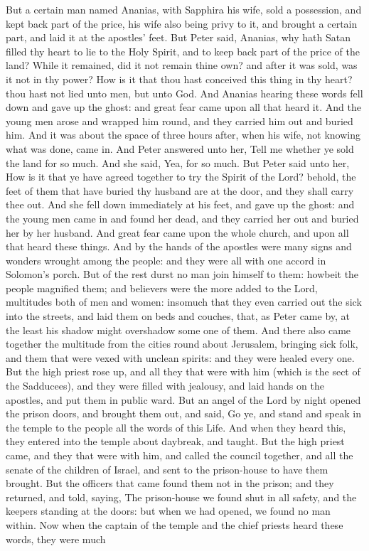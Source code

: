 But a certain man named Ananias, with Sapphira his wife, sold a possession, and kept back part of the price, his wife also being privy to it, and brought a certain part, and laid it at the apostles’ feet. But Peter said, Ananias, why hath Satan filled thy heart to lie to the Holy Spirit, and to keep back part of the price of the land? While it remained, did it not remain thine own? and after it was sold, was it not in thy power? How is it that thou hast conceived this thing in thy heart? thou hast not lied unto men, but unto God. And Ananias hearing these words fell down and gave up the ghost: and great fear came upon all that heard it. And the young men arose and wrapped him round, and they carried him out and buried him.  And it was about the space of three hours after, when his wife, not knowing what was done, came in. And Peter answered unto her, Tell me whether ye sold the land for so much. And she said, Yea, for so much. But Peter said unto her, How is it that ye have agreed together to try the Spirit of the Lord? behold, the feet of them that have buried thy husband are at the door, and they shall carry thee out. And she fell down immediately at his feet, and gave up the ghost: and the young men came in and found her dead, and they carried her out and buried her by her husband. And great fear came upon the whole church, and upon all that heard these things.  And by the hands of the apostles were many signs and wonders wrought among the people: and they were all with one accord in Solomon’s porch. But of the rest durst no man join himself to them: howbeit the people magnified them; and believers were the more added to the Lord, multitudes both of men and women: insomuch that they even carried out the sick into the streets, and laid them on beds and couches, that, as Peter came by, at the least his shadow might overshadow some one of them. And there also came together the multitude from the cities round about Jerusalem, bringing sick folk, and them that were vexed with unclean spirits: and they were healed every one.  But the high priest rose up, and all they that were with him (which is the sect of the Sadducees), and they were filled with jealousy, and laid hands on the apostles, and put them in public ward. But an angel of the Lord by night opened the prison doors, and brought them out, and said, Go ye, and stand and speak in the temple to the people all the words of this Life. And when they heard this, they entered into the temple about daybreak, and taught. But the high priest came, and they that were with him, and called the council together, and all the senate of the children of Israel, and sent to the prison-house to have them brought. But the officers that came found them not in the prison; and they returned, and told, saying, The prison-house we found shut in all safety, and the keepers standing at the doors: but when we had opened, we found no man within. Now when the captain of the temple and the chief priests heard these words, they were much 